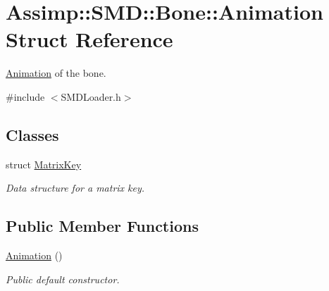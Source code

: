 \hypertarget{struct_assimp_1_1_s_m_d_1_1_bone_1_1_animation}{\section{Assimp\+:\+:S\+M\+D\+:\+:Bone\+:\+:Animation Struct Reference}
\label{struct_assimp_1_1_s_m_d_1_1_bone_1_1_animation}
}


\hyperlink{struct_assimp_1_1_s_m_d_1_1_bone_1_1_animation}{Animation} of the bone.  




{\ttfamily \#include $<$S\+M\+D\+Loader.\+h$>$}

\subsection*{Classes}
\begin{DoxyCompactItemize}
\item 
struct \hyperlink{struct_assimp_1_1_s_m_d_1_1_bone_1_1_animation_1_1_matrix_key}{Matrix\+Key}
\begin{DoxyCompactList}\small\item\em Data structure for a matrix key. \end{DoxyCompactList}\end{DoxyCompactItemize}
\subsection*{Public Member Functions}
\begin{DoxyCompactItemize}
\item 
\hypertarget{struct_assimp_1_1_s_m_d_1_1_bone_1_1_animation_a4cdb005ef2727e1a17e5a3de28ea56d0}{\hyperlink{struct_assimp_1_1_s_m_d_1_1_bone_1_1_animation_a4cdb005ef2727e1a17e5a3de28ea56d0}{Animation} ()}\label{struct_assimp_1_1_s_m_d_1_1_bone_1_1_animation_a4cdb005ef2727e1a17e5a3de28ea56d0}

\begin{DoxyCompactList}\small\item\em Public default constructor. \end{DoxyCompactList}\end{DoxyCompactItemize}
